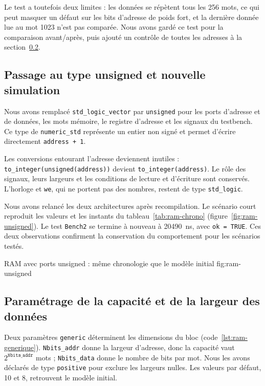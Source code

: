Le test a toutefois deux limites : les données se répètent tous les 256 mots, ce qui peut
masquer un défaut sur les bits d'adresse de poids fort, et la dernière donnée lue au mot
1023 n'est pas comparée. Nous avons gardé ce test pour la comparaison avant/après, puis
ajouté un contrôle de toutes les adresses à la section~\ref{sec:ram-generique}.

\subsection{Passage au type unsigned et nouvelle simulation}

Nous avons remplacé \texttt{std\_logic\_vector} par \texttt{unsigned} pour les ports
d'adresse et de données, les mots mémoire, le registre d'adresse et les signaux du
testbench. Ce type de \texttt{numeric\_std} représente un entier non signé et permet
d'écrire directement \texttt{address + 1}.

Les conversions entourant l'adresse deviennent inutiles :
\texttt{to\_integer(unsigned(address))} devient \texttt{to\_integer(address)}.
Le rôle des signaux, leurs largeurs et les conditions de lecture et d'écriture sont
conservés. L'horloge et \texttt{we}, qui ne portent pas des nombres, restent de type
\texttt{std\_logic}.

Nous avons relancé les deux architectures après recompilation. Le scénario court
reproduit les valeurs et les instants du tableau~\ref{tab:ram-chrono}
(figure~\ref{fig:ram-unsigned}). Le test \texttt{Bench2} se termine à nouveau à 20490~ns,
avec \texttt{ok = TRUE}. Ces deux observations confirment la conservation du comportement
pour les scénarios testés.

{RAM avec ports unsigned : même chronologie que le modèle initial}
{fig:ram-unsigned}

\subsection{Paramétrage de la capacité et de la largeur des données}
\label{sec:ram-generique}

Deux paramètres \texttt{generic} déterminent les dimensions du bloc
(code~\ref{lst:ram-generique}). \texttt{Nbits\_addr} donne la largeur d'adresse, donc la
capacité vaut $2^{\mathtt{Nbits\_addr}}$ mots ; \texttt{Nbits\_data} donne le nombre de bits
par mot. Nous les avons déclarés de type \texttt{positive} pour exclure les largeurs nulles.
Les valeurs par défaut, 10 et 8, retrouvent le modèle initial.

